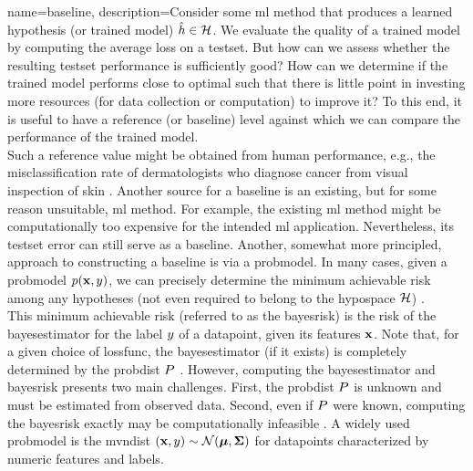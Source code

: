 {name={baseline},
    description={Consider some \gls{ml} method that produces a learned 
    	\gls{hypothesis} (or trained \gls{model}) $\hat{h} \in \mathcal{H}$. We evaluate the quality of a trained \gls{model} 
    	by computing the average \gls{loss} on a \gls{testset}. But how can we assess 
    	whether the resulting \gls{testset} performance is sufficiently good? How can we 
    	determine if the trained \gls{model} performs close to optimal such that there is little point 
   	in investing more resources (for \gls{data} collection or computation) to improve it? 
    	To this end, it is useful to have a reference (or baseline) level against which 
    	we can compare the performance of the trained \gls{model}. \\
	Such a reference value might be obtained from human performance, e.g., the misclassification rate of dermatologists 
    	who diagnose cancer from visual inspection of skin \cite{SkinHumanAI}. Another source for a baseline is an existing, 
    	but for some reason unsuitable, \gls{ml} method. For example, the existing \gls{ml} method 
    	might be computationally too expensive for the intended \gls{ml} application. 
    	Nevertheless, its \gls{testset} error can still serve as a baseline. Another, somewhat more principled, 
    	approach to constructing a baseline is via a \gls{probmodel}. In many cases, given a \gls{probmodel} $p({\bf x},y)$,  
    	we can precisely determine the \gls{minimum} achievable \gls{risk} among any hypotheses
    	(not even required to belong to the \gls{hypospace} $\mathcal{H}$) \cite{LC}. \\
    	This \gls{minimum} achievable \gls{risk} (referred to as the \gls{bayesrisk}) is the \gls{risk} 
    	of the \gls{bayesestimator} for the \gls{label} $y$ of a \gls{datapoint}, given
    	its \glspl{feature} ${\bf x}$. Note that, for a given choice of \gls{lossfunc}, the 
    	\gls{bayesestimator} (if it exists) is completely determined by the \gls{probdist} 
		$P$ \cite[Ch. 4]{LC}. However, computing the \gls{bayesestimator} 
		and \gls{bayesrisk} presents two main challenges. First, the \gls{probdist} 
		$P$ is unknown and 
		must be estimated from observed \gls{data}. Second, even if $P$ 
		were known, computing the \gls{bayesrisk} exactly may be computationally 
		infeasible \cite{cooper1990computational}. 
	A widely used \gls{probmodel} is the \gls{mvndist} $\left( {\bf x},y \right) \sim \mathcal{N}({\bm \mu},{\bm \Sigma})$ 
	for \glspl{datapoint} characterized by numeric \glspl{feature} and \glspl{label}.
}}
